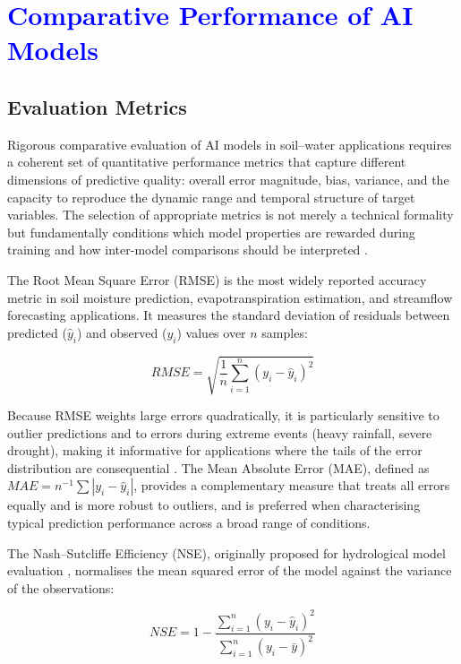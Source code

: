 \documentclass[land,article,submit,pdftex,moreauthors]{Definitions/mdpi}
\numberwithin{equation}{section}
\begin{document}
\section{\textcolor{blue}{Comparative Performance of AI Models}}

\subsection{Evaluation Metrics}

Rigorous comparative evaluation of AI models in soil--water applications requires a coherent set of quantitative performance metrics that capture different dimensions of predictive quality: overall error magnitude, bias, variance, and the capacity to reproduce the dynamic range and temporal structure of target variables. The selection of appropriate metrics is not merely a technical formality but fundamentally conditions which model properties are rewarded during training and how inter-model comparisons should be interpreted \citep{moges2021review}.

The Root Mean Square Error (RMSE) is the most widely reported accuracy metric in soil moisture prediction, evapotranspiration estimation, and streamflow forecasting applications. It measures the standard deviation of residuals between predicted ($\hat{y}_i$) and observed ($y_i$) values over $n$ samples:

\begin{equation}
RMSE=\sqrt{\frac{1}{n}\sum_{i=1}^{n}(y_i-\hat{y}_i)^2}
\end{equation}

Because RMSE weights large errors quadratically, it is particularly sensitive to outlier predictions and to errors during extreme events (heavy rainfall, severe drought), making it informative for applications where the tails of the error distribution are consequential \citep{moges2021review}. The Mean Absolute Error (MAE), defined as $MAE = n^{-1}\sum|y_i - \hat{y}_i|$, provides a complementary measure that treats all errors equally and is more robust to outliers, and is preferred when characterising typical prediction performance across a broad range of conditions.

The Nash--Sutcliffe Efficiency (NSE), originally proposed for hydrological model evaluation \citep{nash1970river}, normalises the mean squared error of the model against the variance of the observations:

\begin{equation}
NSE = 1 - \frac{\sum_{i=1}^{n}(y_i - \hat{y}_i)^2}{\sum_{i=1}^{n}(y_i - \bar{y})^2}
\end{equation}
\end{document}
